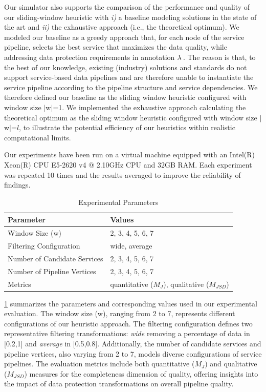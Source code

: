     Our simulator also supports the comparison of the performance and quality of our sliding-window heuristic with \emph{i)} a baseline modeling solutions in the state of the art and \emph{ii)} the exhaustive approach (i.e., the theoretical optimum). We modeled our baseline as a greedy approach that, for each node of the service pipeline, selects the best service that maximizes the data quality, while addressing data protection requirements in annotation $\lambda\,$. The reason is that, to the best of our knowledge, existing (industry) solutions and standards do not support service-based data pipelines and are therefore unable to instantiate the service pipeline according to the pipeline structure and service dependencies. We therefore defined our baseline as the sliding window heuristic configured with window size $|$w$|$=1.
    We implemented the exhaustive approach calculating the theoretical optimum as the sliding window heuristic configured with window size $|$w$|$=$l$, to illustrate the potential efficiency of our heuristics within realistic computational limits.



    Our experiments have been run on a virtual machine equipped with an Intel(R) Xeon(R) CPU E5-2620 v4 @ 2.10GHz CPU and 32GB RAM. Each experiment was repeated 10 times and the results averaged to improve the reliability of findings.



    \begin{table}[!t]
      \caption{Experimental Parameters}
      \label{tab:parameters}
      \centering
      {\color{OurColor2}
        \begin{tabular}{l|l}
          \textbf{Parameter}                  & \textbf{Values}  \\
          \hline
          Window Size (\textbar{}w\textbar{}) & 2, 3, 4, 5, 6, 7 \\
          Filtering Configuration                & wide, average\\
          Number of Candidate Services        & 2, 3, 4, 5, 6, 7 \\
          Number of Pipeline Vertices            & 2, 3, 4, 5, 6, 7 \\
          Metrics                             & quantitative ($M_J$), qualitative ($M_{JSD}$) \\
        \end{tabular}
      }
    \end{table}
  {\color{OurColor2}
  \cref{tab:parameters} summarizes the parameters and corresponding values used in our experimental evaluation. The window size (\textbar{}w\textbar{}), ranging from 2 to 7, represents different configurations of our heuristic approach. The filtering configuration defines two representative filtering transformations: \textit{wide} removing a percentage of data in [0.2,1] and \textit{average} in [0.5,0.8]. Additionally, the number of candidate services and pipeline vertices, also varying from 2 to 7, models diverse configurations of service pipelines. The evaluation metrics include both quantitative ($M_J$) and qualitative ($M_{JSD}$) measures for the completeness dimension of quality, offering insights into the impact of data protection transformations on overall pipeline quality.
  }
